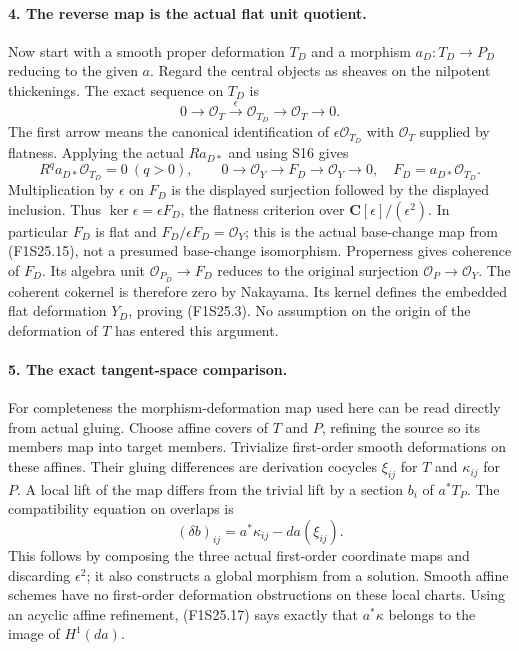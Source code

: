 \paragraph{4. The reverse map is the actual flat unit quotient.}
Now start with a smooth proper deformation $T_D$ and a morphism
$a_D:T_D\to P_D$ reducing to the given $a$. Regard the central
objects as sheaves on the nilpotent thickenings. The exact
sequence on $T_D$ is
\[
 0\longrightarrow\mathcal O_T\xrightarrow{\epsilon}
       \mathcal O_{T_D}\longrightarrow\mathcal O_T\longrightarrow0.
 \tag{F1S25.15}
\]
The first arrow means the canonical identification of
$\epsilon\mathcal O_{T_D}$ with $\mathcal O_T$ supplied by
flatness. Applying the actual $Ra_{D*}$ and using S16 gives
\[
 R^qa_{D*}\mathcal O_{T_D}=0\ (q>0),\qquad
 0\longrightarrow\mathcal O_Y\longrightarrow F_D
        \longrightarrow\mathcal O_Y\longrightarrow0,
       \quad F_D=a_{D*}\mathcal O_{T_D}.
 \tag{F1S25.16}
\]
Multiplication by $\epsilon$ on $F_D$ is the displayed
surjection followed by the displayed inclusion. Thus
$\ker\epsilon=\epsilon F_D$, the flatness criterion over
$\mathbf C[\epsilon]/(\epsilon^2)$. In particular $F_D$ is
flat and $F_D/\epsilon F_D=\mathcal O_Y$; this is the actual
base-change map from (F1S25.15), not a presumed base-change
isomorphism.
Properness gives coherence of $F_D$. Its algebra unit
$\mathcal O_{P_D}\to F_D$ reduces to the original surjection
$\mathcal O_P\to\mathcal O_Y$. The coherent cokernel is
therefore zero by Nakayama. Its kernel defines the embedded
flat deformation $Y_D$, proving (F1S25.3). No assumption on
the origin of the deformation of $T$ has entered this argument.

\paragraph{5. The exact tangent-space comparison.}
For completeness the morphism-deformation map used here can
be read directly from actual gluing. Choose affine covers of
$T$ and $P$, refining the source so its members map into target
members. Trivialize first-order smooth deformations on these
affines. Their gluing differences are derivation cocycles
$\xi_{ij}$ for $T$ and $\kappa_{ij}$ for $P$. A local lift of
the map differs from the trivial lift by a section $b_i$ of
$a^*T_P$. The compatibility equation on overlaps is
\[
                 (\delta b)_{ij}=a^*\kappa_{ij}-da(\xi_{ij}).
 \tag{F1S25.17}
\]
This follows by composing the three actual first-order coordinate
maps and discarding $\epsilon^2$; it also constructs a global
morphism from a solution. Smooth affine schemes have no
first-order deformation obstructions on these local charts.
Using an acyclic affine refinement, (F1S25.17) says exactly
that $a^*\kappa$ belongs to the image of $H^1(da)$.

